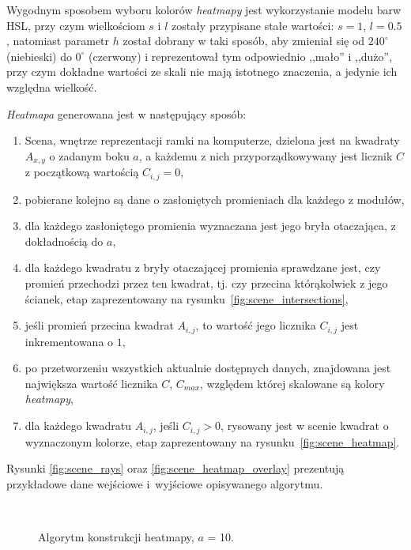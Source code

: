 Wygodnym sposobem wyboru kolorów \textit{heatmapy} jest wykorzystanie modelu barw HSL, przy czym wielkościom $s$ i $l$ zostały przypisane stałe wartości: $s = 1$, $l = 0.5$, natomiast parametr $h$ został dobrany w taki sposób, aby zmieniał się od $240^{\circ}$ (niebieski) do $0^{\circ}$ (czerwony) i reprezentował tym odpowiednio ,,mało'' i ,,dużo'', przy czym dokładne wartości ze skali nie mają istotnego znaczenia, a jedynie ich względna wielkość.

\textit{Heatmapa} generowana jest w następujący sposób:
\begin{enumerate}
 \item Scena, wnętrze reprezentacji ramki na komputerze, dzielona jest na kwadraty $A_{x,y}$ o zadanym boku $a$, a każdemu z nich przyporządkowywany jest licznik $C$ z początkową wartością $C_{i,j} = 0$,
 \item pobierane kolejno są dane o zasłoniętych promieniach dla każdego z modułów,
 \item dla każdego zasłoniętego promienia wyznaczana jest jego bryła otaczająca, z dokładnością do $a$,
 \item dla każdego kwadratu z bryły otaczającej promienia sprawdzane jest, czy promień przechodzi przez ten kwadrat, tj. czy przecina którąkolwiek z jego ścianek, etap zaprezentowany na rysunku~\ref{fig:scene_intersections},
 \item jeśli promień przecina kwadrat $A_{i,j}$, to wartość jego licznika $C_{i,j}$ jest inkrementowana o $1$,
 \item po przetworzeniu wszystkich aktualnie dostępnych danych, znajdowana jest największa wartość licznika $C$, $C_{max}$, względem której skalowane są kolory \textit{heatmapy},
 \item dla każdego kwadratu $A_{i,j}$, jeśli $C_{i,j} > 0$, rysowany jest w scenie kwadrat o wyznaczonym kolorze, etap zaprezentowany na rysunku~\ref{fig:scene_heatmap}.
\end{enumerate}

Rysunki \ref{fig:scene_rays} oraz \ref{fig:scene_heatmap_overlay} prezentują przykładowe dane wejściowe i~wyjściowe opisywanego algorytmu.

\begin{sidewaysfigure}[tbh]
  \myfloatalign
  \vspace{0.085\textheight}
   \quad
   \\
   \quad
  \caption[Algorytm konstrukcji heatmapy]{Algorytm konstrukcji heatmapy, $a$ = 10.}\label{fig:scene_heatmap_algorithm}
\end{sidewaysfigure}

